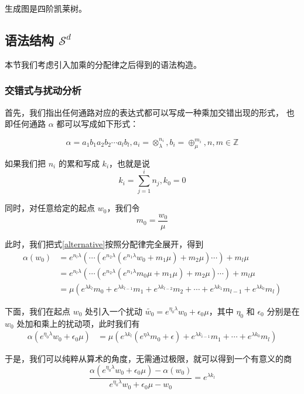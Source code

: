 \documentclass[a4paper,12pt]{article}
\numberwithin{definition}{section}
\numberwithin{lemma}{section}
\numberwithin{proposition}{section}
\numberwithin{theorem}{section}
\numberwithin{grammar}{section}
\numberwithin{program}{section}
\numberwithin{convention}{section}
\numberwithin{corollary}{section}
\begin{document}
生成图是四阶凯莱树。

\subsection{语法结构 $\mathcal{S}^d$}\label{subsec:syntactical2}

本节我们考虑引入加乘的分配律之后得到的语法构造。

\subsubsection{交错式与扰动分析}

首先，我们指出任何通路对应的表达式都可以写成一种乘加交错出现的形式，
也即任何通路 $\alpha$ 都可以写成如下形式：

\begin{equation}
    \alpha = a_1 b_1 a_2 b_2 \cdots a_l b_l, a_i = \otimes_\lambda^{n_i}, b_i = \oplus_\mu^{m_i},  n, m \in \mathbb{Z}
    \label{alternative}
\end{equation}

如果我们把 $n_i$ 的累和写成 $k_i$，也就是说
$$
k_i = \sum_{j=1}^i n_j, k_0 = 0
$$

同时，对任意给定的起点 $w_0$，我们令
$$
m_0 = \frac{w_0}{\mu}
$$

此时，我们把式\ref{alternative}按照分配律完全展开，得到
\begin{align}
\alpha(w_0) & = e^{n_l \lambda}(\cdots (e^{n_2 \lambda} (e^{n_1 \lambda} w_0 + m_1 \mu) + m_2 \mu) \cdots) + m_l \mu \\
& = e^{n_l \lambda}(\cdots (e^{n_2 \lambda} (e^{n_1 \lambda} m_0 \mu + m_1 \mu) + m_2 \mu) \cdots) + m_l \mu \\
& = \mu (e^{\lambda k_l} m_0 + e^{\lambda k_{l - 1}} m_1  + e^{\lambda k_{l - 2}} m_2 + \cdots + e^{\lambda k_1} m_{l-1} + e^{\lambda k_0} m_l)
\end{align}

下面，我们在起点 $w_0$ 处引入一个扰动 $\tilde{w_0} = e^{\eta_0 \lambda} w_0 + \epsilon_0 \mu$，其中 $\eta_0$ 和 $\epsilon_0$ 分别是在 $w_0$ 处加和乘上的扰动项，此时我们有
\begin{align}
\alpha(e^{\eta_0 \lambda} w_0 + \epsilon_0 \mu) & = \mu (e^{\lambda k_l} (e^{\eta \lambda} m_0 + \epsilon) + e^{\lambda k_{i - 1}} m_1 + \cdots + e^{\lambda k_0} m_l)
\end{align}

于是，我们可以纯粹从算术的角度，无需通过极限，就可以得到一个有意义的商
\begin{equation}
\frac{\alpha(e^{\eta_0 \lambda} w_0 + \epsilon_0 \mu) - \alpha(w_0)}{e^{\eta_0 \lambda} w_0 + \epsilon_0 \mu - w_0} = e^{\lambda k_l}
\end{equation}
\end{document}
